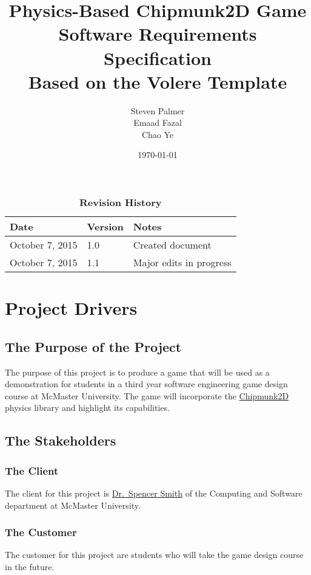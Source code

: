 \documentclass[12pt, titlepage]{article}
\begin{document}
\title{\bf Physics-Based Chipmunk2D Game\\[\baselineskip]\Large Software Requirements Specification\\[2\baselineskip] \large Based on the Volere Template}
\author{Steven Palmer\\Emaad Fazal\\Chao Ye}
\date{\today}
	
\maketitle

\tableofcontents
\listoftables

\begin{table}[bp]
\caption*{\bf Revision History}
\begin{tabularx}{\textwidth}{p{3cm}p{2cm}X}
\toprule {\bf Date} & {\bf Version} & {\bf Notes}\\
\midrule
October 7, 2015 & 1.0 & Created document\\
October 7, 2015 & 1.1 & Major edits in progress\\
\bottomrule
\end{tabularx}
\end{table}

\newpage
{}
\section{Project Drivers}
\subsection{The Purpose of the Project}
The purpose of this project is to produce a game that will be used as a demonstration for students in a third year software engineering game design course at McMaster University.  The game will incorporate the \href{https://chipmunk-physics.net/}{Chipmunk2D} physics library and highlight its capabilities.
\subsection{The Stakeholders}
\subsubsection{The Client}
The client for this project is \href{http://www.cas.mcmaster.ca/~smiths/}{Dr.~Spencer Smith} of the Computing and Software department at McMaster University.
\subsubsection{The Customer}
The customer for this project are students who will take the game design course in the future.
\end{document}
